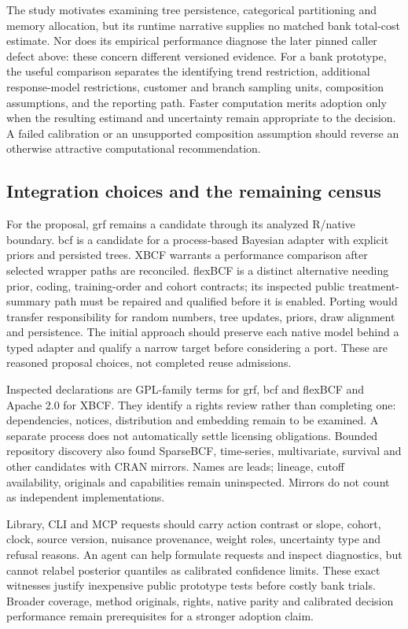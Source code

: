 The study motivates examining tree persistence, categorical partitioning and memory allocation, but its runtime narrative supplies no matched bank total-cost estimate. Nor does its empirical performance diagnose the later pinned caller defect above: these concern different versioned evidence. For a bank prototype, the useful comparison separates the identifying trend restriction, additional response-model restrictions, customer and branch sampling units, composition assumptions, and the reporting path. Faster computation merits adoption only when the resulting estimand and uncertainty remain appropriate to the decision. A failed calibration or an unsupported composition assumption should reverse an otherwise attractive computational recommendation.~\citep{rel17flexpaper,rel16flexcallers}

\subsection{Integration choices and the remaining census}
\label{exec21:cxx-integration}
For the proposal, grf remains a candidate through its analyzed R/native boundary. bcf is a candidate for a process-based Bayesian adapter with explicit priors and persisted trees. XBCF warrants a performance comparison after selected wrapper paths are reconciled. flexBCF is a distinct alternative needing prior, coding, training-order and cohort contracts; its inspected public treatment-summary path must be repaired and qualified before it is enabled. Porting would transfer responsibility for random numbers, tree updates, priors, draw alignment and persistence. The initial approach should preserve each native model behind a typed adapter and qualify a narrow target before considering a port. These are reasoned proposal choices, not completed reuse admissions.~\citep{exec21_cxx_grf,exec21_cxx_bcf,exec21_cxx_xbcf,exec21_cxx_flexbcf}

Inspected declarations are GPL-family terms for grf, bcf and flexBCF and Apache 2.0 for XBCF. They identify a rights review rather than completing one: dependencies, notices, distribution and embedding remain to be examined. A separate process does not automatically settle licensing obligations. Bounded repository discovery also found SparseBCF, time-series, multivariate, survival and other candidates with CRAN mirrors. Names are leads; lineage, cutoff availability, originals and capabilities remain uninspected. Mirrors do not count as independent implementations.~\citep{exec21_cxx_grf,exec21_cxx_bcf,exec21_cxx_xbcf,exec21_cxx_flexbcf}

Library, CLI and MCP requests should carry action contrast or slope, cohort, clock, source version, nuisance provenance, weight roles, uncertainty type and refusal reasons. An agent can help formulate requests and inspect diagnostics, but cannot relabel posterior quantiles as calibrated confidence limits. These exact witnesses justify inexpensive public prototype tests before costly bank trials. Broader coverage, method originals, rights, native parity and calibrated decision performance remain prerequisites for a stronger adoption claim.
